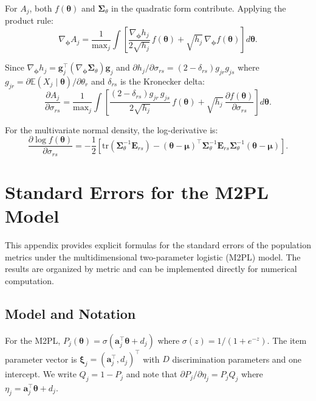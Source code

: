 \documentclass[man, 12pt, floatsintext]{apa7}
\begin{document}
For $A_j$, both $f(\boldsymbol{\theta})$ and $\boldsymbol{\Sigma}_\theta$ in the quadratic form contribute. Applying the product rule:
$$\nabla_{\boldsymbol{\phi}} A_j = \frac{1}{\mathrm{max}_j}\int \left[\frac{\nabla_{\boldsymbol{\phi}} h_j}{2\sqrt{h_j}}\, f(\boldsymbol{\theta}) + \sqrt{h_j}\, \nabla_{\boldsymbol{\phi}} f(\boldsymbol{\theta})\right] d\boldsymbol{\theta}.$$

Since $\nabla_{\boldsymbol{\phi}} h_j = \mathbf{g}_j^\top (\nabla_{\boldsymbol{\phi}} \boldsymbol{\Sigma}_\theta) \mathbf{g}_j$ and $\partial h_j/\partial \sigma_{rs} = (2-\delta_{rs})g_{jr}g_{js}$ where $g_{jr} = \partial \mathbb{E}(X_j \mid \boldsymbol{\theta})/\partial \theta_r$ and $\delta_{rs}$ is the Kronecker delta:
\begin{equation}\label{eq:grad-A-sigma}
\frac{\partial A_j}{\partial \sigma_{rs}} = \frac{1}{\mathrm{max}_j}\int \left[\frac{(2-\delta_{rs})g_{jr}\, g_{js}}{2\sqrt{h_j}}\, f(\boldsymbol{\theta}) + \sqrt{h_j}\, \frac{\partial f(\boldsymbol{\theta})}{\partial \sigma_{rs}}\right] d\boldsymbol{\theta}.
\end{equation}

For the multivariate normal density, the log-derivative is:
$$\frac{\partial \log f(\boldsymbol{\theta})}{\partial \sigma_{rs}} = -\frac{1}{2}\left[\text{tr}(\boldsymbol{\Sigma}_\theta^{-1}\mathbf{E}_{rs}) - (\boldsymbol{\theta}-\boldsymbol{\mu})^\top \boldsymbol{\Sigma}_\theta^{-1}\mathbf{E}_{rs}\boldsymbol{\Sigma}_\theta^{-1}(\boldsymbol{\theta}-\boldsymbol{\mu})\right].$$

\section{Standard Errors for the M2PL Model}\label{app:m2pl-derivations}

This appendix provides explicit formulas for the standard errors of the population metrics under the multidimensional two-parameter logistic (M2PL) model. The results are organized by metric and can be implemented directly for numerical computation.

\subsection{Model and Notation}

For the M2PL, $P_j(\boldsymbol{\theta}) = \sigma(\mathbf{a}_j^\top\boldsymbol{\theta} + d_j)$ where $\sigma(z) = 1/(1+e^{-z})$. The item parameter vector is $\boldsymbol{\xi}_j = (\mathbf{a}_j^\top, d_j)^\top$ with $D$ discrimination parameters and one intercept. We write $Q_j = 1 - P_j$ and note that $\partial P_j/\partial \eta_j = P_j Q_j$ where $\eta_j = \mathbf{a}_j^\top\boldsymbol{\theta} + d_j$.
\end{document}
